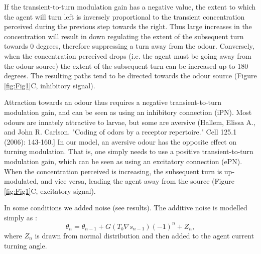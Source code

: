 \documentclass[10pt,a4paper]{article}
\begin{document}
If the transient-to-turn modulation gain has a negative value, the extent to which the agent will turn left is inversely proportional to the transient concentration perceived during the previous step towards the right. Thus large increases in the concentration will result in down regulating the extent of the subsequent turn towards 0 degrees, therefore suppressing a turn away from the odour. Conversely, when the concentration perceived drops (i.e. the agent must be going away from the odour source) the extent of the subsequent turn can be increased up to 180 degrees. The resulting paths tend to be directed towards the odour source (Figure \ref{fig:Fig1}C, inhibitory signal). 

Attraction towards an odour thus requires a negative transient-to-turn modulation gain, and can be seen as using an inhibitory connection (iPN).  Most odours are innately attractive to larvae, but some are aversive (Hallem, Elissa A., and John R. Carlson. "Coding of odors by a receptor repertoire." Cell 125.1 (2006): 143-160.] In our model, an aversive odour has the opposite effect on turning modulation. That is, one simply needs to use a positive transient-to-turn modulation gain, which can be seen as using an excitatory connection (ePN). When the concentration perceived is increasing, the subsequent turn is up-modulated, and vice versa, leading the agent away from the source (Figure \ref{fig:Fig1}C, excitatory signal).

In some conditions we added noise (see results). The additive noise is modelled simply as :
\begin{equation}
\theta_n = \theta_{n-1} + G (T_b \nabla s_{n-1})(-1)^n + Z_n,
\end{equation}
where $Z_n$ is drawn from normal distribution and then added to the agent current turning angle. 

 
\end{document}

